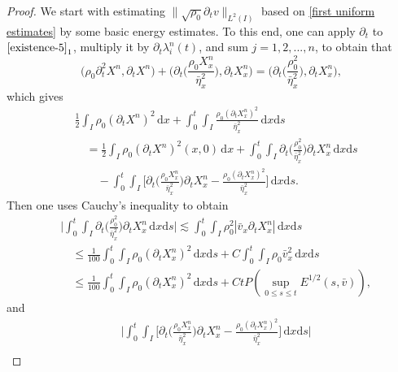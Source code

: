 \documentclass[11pt, reqno]{amsart}
\newcommand{\diff}{\mathrm{d}}
\numberwithin{equation}{section}
\begin{document}
{\begin{proof}
 We start with estimating \(\|\sqrt{\rho_0}\partial_tv\|_{L^2(I)}\) based on \eqref{first uniform estimates} by some basic energy estimates.
To this end,
one can apply \(\partial_t\) to \(\eqref{existence-5}_1\), multiply it by \(\partial_t\lambda_i^n(t)\), and sum \(j=1,2,...,n\), to obtain that
\begin{equation*}
		\big(\rho_0\partial_t^2X^n,\partial_tX^n\big)
		+\bigg(\partial_t\bigg(\frac{\rho_0X_x^n}{\bar{\eta}_x^2}\bigg),\partial_tX_x^n\bigg)
		=\bigg(\partial_t\bigg(\frac{\rho_0^2}{\bar{\eta}_x^2}\bigg),\partial_tX_x^n\bigg),
\end{equation*}
which gives
\begin{equation}\label{existence-add-1}
\begin{aligned}
&\frac{1}{2}\int_I \rho_0(\partial_tX^n)^2\,\diff x
+\int_0^t\int_I\frac{\rho_0(\partial_tX^n_x)^2}{\bar{\eta}_x^2}\,\diff x\diff s\\
&\quad=\frac{1}{2}\int_I \rho_0(\partial_tX^n)^2(x,0)\,\diff x+\int_0^t\int_I\partial_t\bigg({\frac{\rho_0^2}{\bar{\eta}_x^2}}\bigg)\partial_tX^n_x\,\diff x\diff s\\
&\qquad-\int_0^t\int_I\bigg[\partial_t\bigg(\frac{\rho_0X^n_x}{\bar{\eta}_x^2}\bigg)\partial_tX^n_x
-\frac{\rho_0(\partial_tX^n_x)^2}{\bar{\eta}_x^2}\bigg]\,\diff x\diff s.
\end{aligned}
\end{equation}
Then one uses Cauchy's inequality to obtain
\begin{equation}\label{existence-add-2}
\begin{aligned}
&\bigg|\int_0^t\int_I\partial_t\bigg({\frac{\rho_0^2}{\bar{\eta}_x^2}}\bigg)\partial_tX^n_x\,\diff x\diff s\bigg|\lesssim \int_0^t\int_I\rho_0^2|\bar{v}_x\partial_tX^n_x|\,\diff x\diff s\\
&\quad\leq \frac{1}{100}\int_0^t\int_I\rho_0(\partial_tX^n_x)^2\,\diff x\diff s
+C\int_0^t\int_I\rho_0\bar{v}_x^2\,\diff x\diff s\\
&\quad\leq \frac{1}{100}\int_0^t\int_I\rho_0(\partial_tX^n_x)^2\,\diff x\diff s+Ct P(\sup_{0\leq s\leq t}E^{1/2}(s,\bar{v})),
\end{aligned}
\end{equation}
and
\begin{equation}\label{existence-add-3}
\begin{aligned}
&\bigg|\int_0^t\int_I\bigg[\partial_t\bigg(\frac{\rho_0X^n_x}{\bar{\eta}_x^2}\bigg)\partial_tX^n_x
-\frac{\rho_0(\partial_tX^n_x)^2}{\bar{\eta}_x^2}\bigg]\,\diff x\diff s\bigg|\\

\end{aligned}
\end{equation}
\end{proof}}
\end{document}
